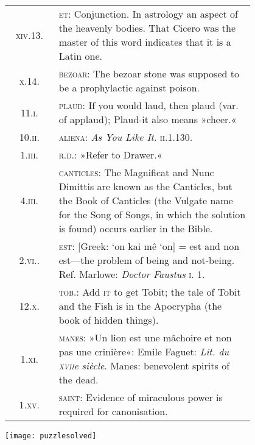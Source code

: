 \begin{longtable} {c p{0.8\linewidth}}
\textsc{xiv}.13. & \textsc{et}: Conjunction. In astrology an aspect of the heavenly bodies. That Cicero was the master of this word indicates that it is a Latin one.\\

\textsc{x}.14. & \textsc{bezoar}: The bezoar stone was supposed to be a prophylactic against poison.\\

11.\textsc{i.} & \textsc{plaud}: If you would laud, then plaud (var. of applaud); Plaud-it also means »cheer.«\\

10.\textsc{ii.} &  \textsc{aliena}: \textit{As You Like It}. \textsc{ii}.1.130.\\

1.\textsc{iii.} &  \textsc{r.d.}: »Refer to Drawer.«\\

4.\textsc{iii.} &  \textsc{canticles}: The Magnificat and Nunc Dimittis are known as the Canticles, but the Book of Canticles (the Vulgate name for the Song of Songs, in which the solution is found) occurs earlier in the Bible.\\

2.\textsc{vi.}. &  \textsc{est}: [Greek: `on kai mê `on] = est and non est—the problem of being and not-being. Ref. Marlowe: \textit{Doctor Faustus} \textsc{i}. 1.\\

12.\textsc{x.} &  \textsc{tob}.: Add \textsc{it} to get Tobit; the tale of Tobit and the Fish is in the Apocrypha (the book of hidden things).\\

1.\textsc{xi.} &  \textsc{manes}: »Un lion est une mâchoire et non pas une crinière«: Emile Faguet: \textit{Lit. du \textsc{xvii}e siècle}. Manes: benevolent spirits of the dead.\\

1.\textsc{xv}. &  \textsc{saint}: Evidence of miraculous power is required for canonisation.\\
\end{longtable}

\texttt{[image: puzzlesolved]}
